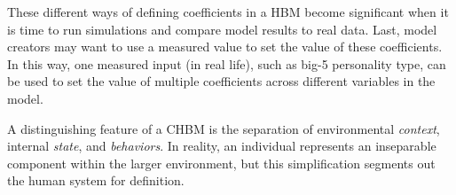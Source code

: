 \documentclass[runningheads,a4paper]{llncs}
\begin{document}
These different ways of defining coefficients in a HBM become significant when it is time to run simulations and compare model results to real data. 
Last, model creators may want to use a measured value to set the value of these coefficients. In this way, one measured input (in real life), such as big-5 personality type, can be used to set the value of multiple coefficients across different variables in the model.

% 


A distinguishing feature of a CHBM is the separation of environmental \emph{context}, internal \emph{state}, and \emph{behaviors}.
In reality, an individual represents an inseparable component within the larger environment, but this simplification segments out the human system for definition.
\end{document}
